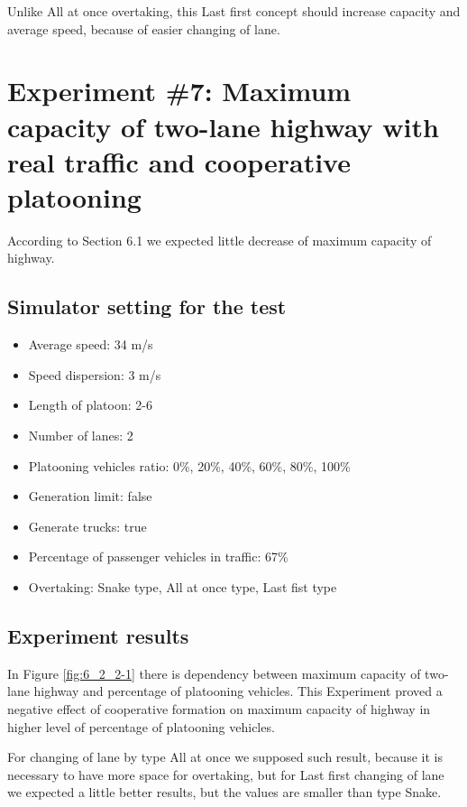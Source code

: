 Unlike All at once overtaking, this Last first concept should increase capacity and average speed, because of easier changing of lane.






\newpage
\section[Experiment \#7: Maximum capacity of two-lane highway with real traffic and cooperative platooning]{Experiment \#7: Maximum capacity of two-lane highway with real traffic and cooperative platooning}

According to Section 6.1 we expected little decrease of maximum capacity of highway.



\subsection*{Simulator setting for the test}
\begin{itemize}
\item Average speed: 34 m/s
\item Speed dispersion: 3 m/s
\item Length of platoon: 2-6
\item Number of lanes:  2
\item Platooning vehicles ratio: 0\%, 20\%, 40\%, 60\%, 80\%, 100\%
\item Generation limit: false
\item Generate trucks: true
\item Percentage of passenger vehicles in traffic: 67\%
\item Overtaking: Snake type, All at once type, Last fist type
\end{itemize}



\subsection*{Experiment results}

In Figure \ref{fig:6_2_2-1} there is dependency between maximum capacity of two-lane highway and percentage of platooning vehicles. This Experiment proved a negative effect of cooperative formation on maximum capacity of highway in higher level of percentage of platooning vehicles. 

For changing of lane by type All at once we supposed such result, because it is necessary to have more space for overtaking, but for Last first changing of lane we expected a little better results, but the values are smaller than type Snake.


